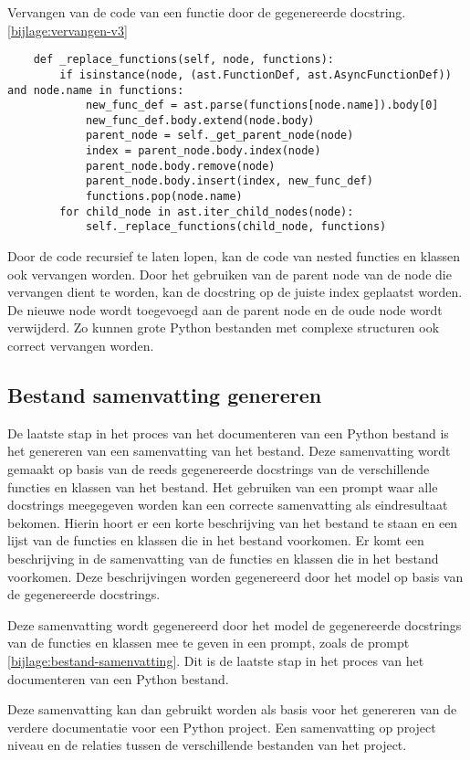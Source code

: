 \begin{listing}
    \caption[Code voor het vervangen van een docstring v2]{Vervangen van de code van een functie door de gegenereerde docstring. \ref{bijlage:vervangen-v3}}
    \label{lst:vervangen-v3}
    \begin{verbatim}
    def _replace_functions(self, node, functions):
        if isinstance(node, (ast.FunctionDef, ast.AsyncFunctionDef)) and node.name in functions:
            new_func_def = ast.parse(functions[node.name]).body[0]
            new_func_def.body.extend(node.body)
            parent_node = self._get_parent_node(node)
            index = parent_node.body.index(node)
            parent_node.body.remove(node)
            parent_node.body.insert(index, new_func_def)
            functions.pop(node.name)
        for child_node in ast.iter_child_nodes(node):
            self._replace_functions(child_node, functions)
    \end{verbatim}
\end{listing}

Door de code recursief te laten lopen, kan de code van nested functies en klassen ook vervangen worden.
Door het gebruiken van de parent node van de node die vervangen dient te worden, kan de docstring op de juiste index geplaatst worden.
De nieuwe node wordt toegevoegd aan de parent node en de oude node wordt verwijderd.
Zo kunnen grote Python bestanden met complexe structuren ook correct vervangen worden.

\subsection{Bestand samenvatting genereren}
\label{sec:bestanddocumentatie-samenvatting}
De laatste stap in het proces van het documenteren van een Python bestand is het genereren van een samenvatting van het bestand.
Deze samenvatting wordt gemaakt op basis van de reeds gegenereerde docstrings van de verschillende functies en klassen van het bestand.
Het gebruiken van een prompt waar alle docstrings meegegeven worden kan een correcte samenvatting als eindresultaat bekomen.
Hierin hoort er een korte beschrijving van het bestand te staan en een lijst van de functies en klassen die in het bestand voorkomen.
Er komt een beschrijving in de samenvatting van de functies en klassen die in het bestand voorkomen.
Deze beschrijvingen worden gegenereerd door het model op basis van de gegenereerde docstrings.

Deze samenvatting wordt gegenereerd door het model de gegenereerde docstrings van de functies en klassen mee te geven in een prompt, zoals de prompt \ref{bijlage:bestand-samenvatting}.
Dit is de laatste stap in het proces van het documenteren van een Python bestand.

Deze samenvatting kan dan gebruikt worden als basis voor het genereren van de verdere documentatie voor een Python project.
Een samenvatting op project niveau en de relaties tussen de verschillende bestanden van het project.